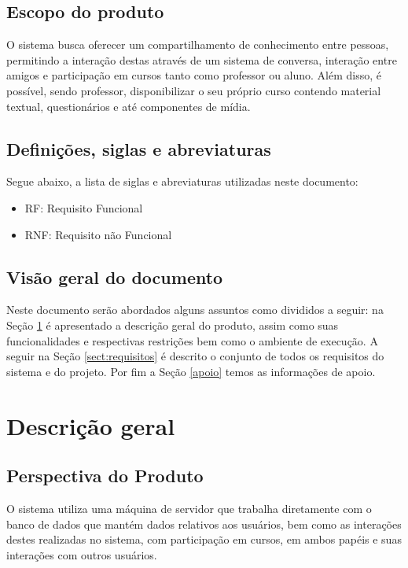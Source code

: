\documentclass[12pt,a4paper,onecolumn,titlepage]{article}
\begin{document}
\subsection{Escopo do produto}

O sistema busca oferecer um compartilhamento de conhecimento entre pessoas, permitindo a interação destas através de um sistema de conversa, interação entre amigos e participação em cursos tanto como professor ou aluno. Além disso, é possível, sendo professor, disponibilizar o seu próprio curso contendo material textual, questionários e até componentes de mídia.

\subsection{Definições, siglas e abreviaturas}

Segue abaixo, a lista de siglas e abreviaturas utilizadas neste documento:
\begin{itemize}
\item RF: Requisito Funcional
\item RNF: Requisito não Funcional
\end{itemize}

\subsection{Visão geral do documento}

Neste documento serão abordados alguns assuntos como divididos a seguir: na Seção \ref{sect:descricao} é apresentado a descrição geral do produto, assim como suas funcionalidades e respectivas restrições bem como o ambiente de execução. A seguir na Seção \ref{sect:requisitos} é descrito o conjunto de todos os requisitos do sistema e do projeto. Por fim a Seção \ref{apoio} temos as informações de apoio.

\section{Descrição geral}
\label{sect:descricao}

\subsection{Perspectiva do Produto}

O sistema utiliza uma máquina de servidor que trabalha diretamente com o banco de dados que mantém dados relativos aos usuários, bem como as interações destes realizadas no sistema, com participação em cursos, em ambos papéis e suas interações com outros usuários.
\end{document}
